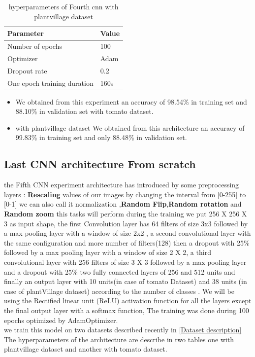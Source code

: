 \begin{table}[H]
\begin{tabular}{@{}|p{9cm}|p{3cm}|@{}}
\hline
 \centering \textbf{Parameter} & \textbf{Value}  \\ \hline
 Number of epochs & 100  \\  \hline
 Optimizer & Adam \\ \hline
 Dropout rate & 0.2\\ \hline
 One epoch training duration & 160s \\ \hline
 
\end{tabular}
\caption{hyperparameters of Fourth cnn with plantvillage dataset}
\end{table}
\begin{itemize}
    \item We obtained from this experiment an accuracy of 98.54\% in training set and 88.10\% in validation set with tomato dataset.
    \item with plantvillage dataset We obtained from this architecture an accuracy of 99.83\% in training set and only 88.48\% in validation set.
\end{itemize}

\subsection{Last CNN architecture From scratch}
the Fifth CNN experiment architecture has introduced by some preprocessing layers : \textbf{Rescaling} values of our images by changing the interval from [0-255] to [0-1] we can also call it normalization ,\textbf{Random Flip},\textbf{Random rotation} and \textbf{Random zoom} this tasks will perform during the training
we put 256 X 256 X 3 as input shape, the first Convolution layer has 64 filters of size 3x3 followed by a max pooling layer with a window of size 2x2 , a second convolutional layer with the same configuration and more number of filters(128) then a dropout with 25\% followed by a max pooling layer with a window of size 2 X 2,
a third convolutional layer with 256 filters of size 3 X 3
followed by a  max pooling layer and a dropout with 25\%
two fully connected layers of 256 and 512 units and finally an output layer with 10 units(in case of tomato Dataset) and 38 units (in case of plantVillage dataset) according to the number of classes .
We will be using the Rectified linear unit (ReLU) activation
function for all the layers except the final output layer with a softmax function,
The training was done
during 100 epochs optimized by AdamOptimizer.\\
we train this model on two datasets described recently in \ref{Dataset description}
The hyperparameters of the architecture are
describe in two tables one with plantvillage dataset and another with tomato dataset.\\

